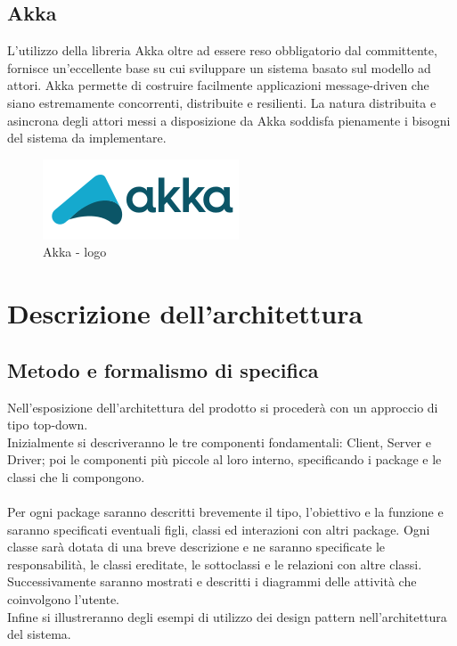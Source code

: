 \documentclass[a4paper]{article}
\begin{document}
	\subsection{Akka}
		L'utilizzo della libreria Akka oltre ad essere reso obbligatorio dal committente, fornisce un'eccellente base su cui sviluppare un sistema basato sul modello ad attori.
        Akka permette di costruire facilmente applicazioni message-driven che siano estremamente concorrenti, distribuite e resilienti.         
        La natura distribuita e asincrona degli attori messi a disposizione da Akka soddisfa pienamente i bisogni del sistema da implementare.
	\begin{figure} [H]
			\centering
			\includegraphics[scale=0.45]{immagini/ST/Akka.png}
			\caption{Akka - logo}
		\end{figure}	
	
	
	\newpage 
	\section{Descrizione dell'architettura}
		\subsection{Metodo e formalismo di specifica}
			Nell'esposizione dell'architettura del prodotto si procederà con un approccio di tipo top-down. \\
			Inizialmente si descriveranno le tre componenti fondamentali: Client, Server e Driver; poi le componenti più piccole al loro interno, 
			specificando i package e le classi che li compongono. \\ \\
			Per ogni package saranno descritti brevemente il tipo, l'obiettivo e la funzione e saranno specificati eventuali figli, classi ed 
			interazioni con altri package. Ogni classe sarà dotata di una breve descrizione e ne saranno specificate le responsabilità, 
			le classi ereditate, le sottoclassi e le relazioni con altre classi. \\
			Successivamente saranno mostrati e descritti i diagrammi delle attività che coinvolgono l'utente. \\
			Infine si illustreranno degli esempi di utilizzo dei design pattern nell'architettura del sistema.
\end{document}
